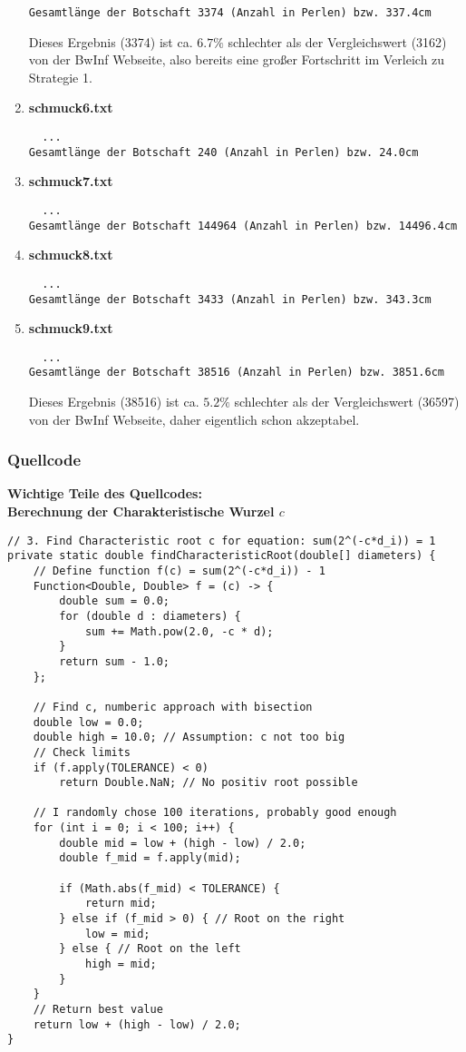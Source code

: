 \documentclass[a4paper,10pt,ngerman]{scrartcl}
\begin{document}
\begin{enumerate}
\begin{verbatim}
Gesamtlänge der Botschaft 3374 (Anzahl in Perlen) bzw. 337.4cm
\end{verbatim}

Dieses Ergebnis (3374) ist ca. $6.7\%$ schlechter als der Vergleichswert (3162) von der BwInf Webseite, also bereits eine großer Fortschritt im Verleich zu Strategie 1.
  \item \textbf{schmuck6.txt}
\begin{verbatim}
  ...
Gesamtlänge der Botschaft 240 (Anzahl in Perlen) bzw. 24.0cm
\end{verbatim}
  \item \textbf{schmuck7.txt}
\begin{verbatim}
  ...
Gesamtlänge der Botschaft 144964 (Anzahl in Perlen) bzw. 14496.4cm
\end{verbatim}
  \item \textbf{schmuck8.txt}
\begin{verbatim}
  ...
Gesamtlänge der Botschaft 3433 (Anzahl in Perlen) bzw. 343.3cm
\end{verbatim}
  \item \textbf{schmuck9.txt}
\begin{verbatim}
  ...
Gesamtlänge der Botschaft 38516 (Anzahl in Perlen) bzw. 3851.6cm
\end{verbatim}
Dieses Ergebnis (38516) ist ca. $5.2\%$ schlechter als der Vergleichswert (36597) von der BwInf Webseite, daher eigentlich schon akzeptabel.
\end{enumerate}

\subsubsection{Quellcode}
\textbf{Wichtige Teile des Quellcodes:}\\

\textbf{Berechnung der Charakteristische Wurzel $c$}
\begin{lstlisting}
// 3. Find Characteristic root c for equation: sum(2^(-c*d_i)) = 1
private static double findCharacteristicRoot(double[] diameters) {
    // Define function f(c) = sum(2^(-c*d_i)) - 1
    Function<Double, Double> f = (c) -> {
        double sum = 0.0;
        for (double d : diameters) {
            sum += Math.pow(2.0, -c * d);
        }
        return sum - 1.0;
    };

    // Find c, numberic approach with bisection
    double low = 0.0;
    double high = 10.0; // Assumption: c not too big
    // Check limits
    if (f.apply(TOLERANCE) < 0)
        return Double.NaN; // No positiv root possible

    // I randomly chose 100 iterations, probably good enough
    for (int i = 0; i < 100; i++) {
        double mid = low + (high - low) / 2.0;
        double f_mid = f.apply(mid);

        if (Math.abs(f_mid) < TOLERANCE) {
            return mid;
        } else if (f_mid > 0) { // Root on the right
            low = mid;
        } else { // Root on the left
            high = mid;
        }
    }
    // Return best value
    return low + (high - low) / 2.0;
}
\end{lstlisting}
\end{document}
